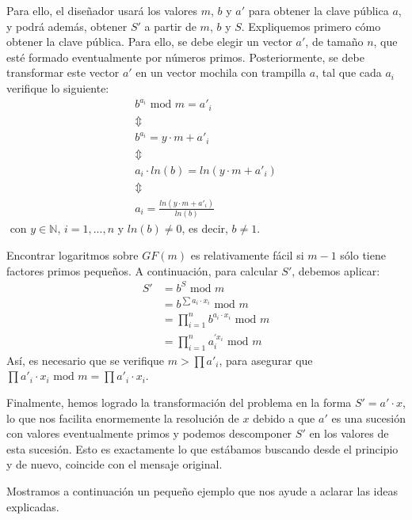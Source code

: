     Para ello, el diseñador usará los valores $m$, $b$ y $a'$ para obtener la clave pública $a$, y podrá además, obtener $S'$ a partir de $m$, $b$ y $S$. Expliquemos primero cómo obtener la clave pública. Para ello, se debe elegir un vector $a'$, de tamaño $n$, que esté formado eventualmente por números primos. Posteriormente, se debe
    transformar este vector $a'$ en un vector mochila con trampilla $a$, tal que cada $a_{i}$ verifique lo siguiente:
    \begin{gather*}
        b^{a_{i}} \text{ mod } m = a'_{i}
        \\ \Updownarrow \\ 
        b^{a_{i}} = y \cdot m + a'_{i}
        \\ \Updownarrow \\ 
        a_{i} \cdot ln(b) = ln(y \cdot m + a'_{i})
        \\ \Updownarrow \\ 
        a_{i} = \frac{ln(y \cdot m + a'_{i})}{ln(b)}
    \end{gather*}
    $\text{ con } y \in \mathbb{N} \text{, } i = 1, ... , n$ y $ln(b) \neq 0$, es decir, $b \neq 1$. 
    
    Encontrar logaritmos sobre $GF(m)$ es relativamente fácil si $m - 1$ sólo tiene factores primos pequeños. A continuación, para calcular $S'$, debemos aplicar: 
    \begin{align}
        S' &= b^{S} \text{ mod } m \\
           &= b^{\sum a_{i} \cdot x_{i}} \text{ mod } m \\
           &= \prod_{i=1}^{n} b^{a_{i} \cdot x_{i}} \text{ mod } m \\
           &= \prod_{i=1}^{n} a_{i}^{'x_{i}} \text{ mod } m  
    \end{align}
    Así, es necesario que se verifique $m > \prod a'_{i}$, para asegurar que $\prod a'_{i} \cdot x_{i} \text{ mod } m = \prod a'_{i} \cdot x_{i}$.

    Finalmente, hemos logrado la transformación del problema en la forma $S' = a' \cdot x$, lo que nos facilita enormemente la resolución de $x$ debido a que $a'$ es una sucesión con valores eventualmente primos y podemos descomponer $S'$ en los valores de esta sucesión. Esto es exactamente lo que estábamos buscando desde el principio y de nuevo, coincide con el mensaje original.
    
    Mostramos a continuación un pequeño ejemplo que nos ayude a aclarar las ideas explicadas.

